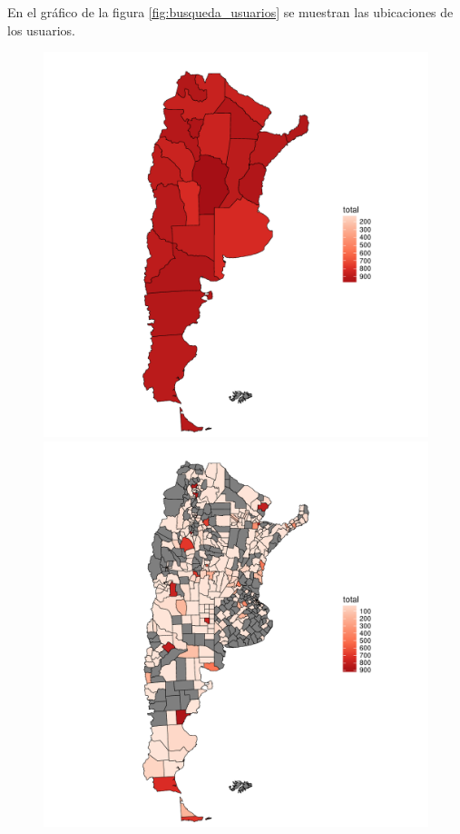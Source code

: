 En el gráfico de la figura \ref{fig:busqueda_usuarios} se muestran las ubicaciones de los usuarios.


\begin{figure}[!ht]\centering
  \begin{minipage}{0.31\textwidth}
    \includegraphics[width=\linewidth]{./images/mapaprovincias.pdf}
    \caption{} 
    \label{fig:mapaProvincias} 
   \end{minipage}
   \begin{minipage}{0.31\textwidth}
    \includegraphics[width=\linewidth]{./images/mapadepartamentos.pdf}

\end{minipage}
\end{figure}
